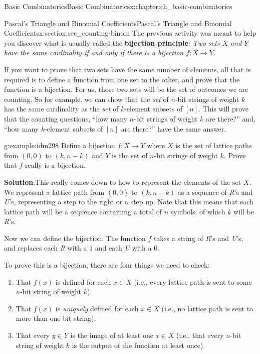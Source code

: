 \documentclass[oneside,10pt,]{book}
\newcommand{\terminology}[1]{\textbf{#1}}
\numberwithin{equation}{chapter}
\begin{document}
\begin{chapterptx}{Basic Combinatorics}{}{Basic Combinatorics}{}{}{x:chapter:ch_basic-combinatorics}
\begin{sectionptx}{Pascal's Triangle and Binomial Coefficients}{}{Pascal's Triangle and Binomial Coefficients}{}{}{x:section:sec_counting-binom}
The previous activity was meant to help you discover what is usually called the \terminology{bijection principle}: \emph{Two sets \(X\) and \(Y\) have the same cardinality if and only if there is a bijection \(f:X \to Y\)}.%
\par
If you want to prove that two sets have the same number of elements, all that is required is to define a function from one set to the other, and prove that the function is a bijection.  For us, those two sets will be the set of outcomes we are counting.  So for example, we can show that the \emph{set} of \(n\)-bit strings of weight \(k\) has the same cardinality as the \emph{set} of \(k\)-element subsets of \([n]\).  This will prove that the counting questions, ``how many \(n\)-bit strings of weight \(k\) are there?'' and, ``how many \(k\)-element subsets of \([n]\) are there?'' have the same answer.%
\par
%
\begin{example}{}{g:example:idm298}%
Define a bijection \(f:X \to Y\) where \(X\) is the set of lattice paths from \((0,0)\) to \((k,n-k)\) and \(Y\) is the set of \(n\)-bit strings of weight \(k\). Prove that \(f\) really is a bijection.%
\par\smallskip%
\noindent\textbf{Solution}.\hypertarget{g:solution:idm309}{}\quad{}This really comes down to how to represent the elements of the set \(X\). We represent a lattice path from \((0,0)\) to \((k, n-k)\) as a sequence of \emph{R}'s and \emph{U}'s, representing a step to the right or a step up.  Note that this means that each lattice path will be a sequence containing a total of \(n\) symbols, of which \(k\) will be \emph{R}'s.%
\par
Now we can define the bijection.  The function \(f\) takes a string of \emph{R}'s and \emph{U}'s, and replaces each \emph{R} with a 1 and each \emph{U} with a 0.%
\par
To prove this is a bijection, there are four things we need to check:%
\begin{enumerate}
\item{}That \(f(x)\) is defined for each \(x \in X\) (i.e., every lattice path is sent to some \(n\)-bit string of weight \(k\)).%
\item{}That \(f(x)\) is \emph{uniquely} defined for each \(x \in X\) (i.e., no lattice path is sent to more than one bit string).%
\item{}That every \(y \in Y\) is the image of at least one \(x \in X\) (i.e., that every \(n\)-bit string of weight \(k\) is the output of the function at least once).%

\end{enumerate}
\end{example}
\end{sectionptx}
\end{chapterptx}
\end{document}
